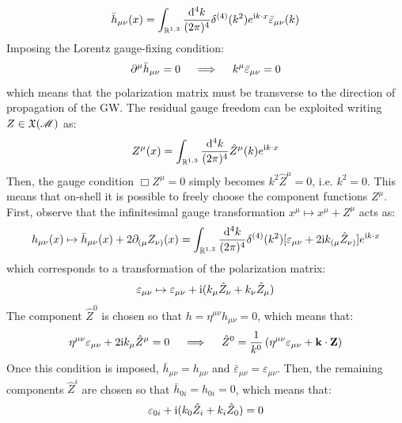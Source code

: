 \begin{equation}
  \bar{h}_{\mu \nu}(x) = \int_{\mathbb{R}^{1,3}} \frac{\mathrm{d}^4k}{(2\pi)^4} \delta^{(4)}(k^2) e^{\mathrm{i} k \cdot x} \bar{\varepsilon}_{\mu \nu}(k)
\end{equation}
Imposing the Lorentz gauge-fixing condition:
\begin{equation*}
  \partial^\mu \bar{h}_{\mu \nu} = 0
  \quad \implies \quad
  k^\mu \bar{\varepsilon}_{\mu \nu} = 0
\end{equation*}
which means that the polarization matrix must be transverse to the direction of propagation of the GW. The residual gauge freedom can be exploited writing $ Z \in \mathfrak{X}(\mathscr{M}) $ as:
\begin{equation*}
  Z^\mu(x) = \int_{\mathbb{R}^{1,3}} \frac{\mathrm{d}^4k}{(2\pi)^4} \hat{Z}^\mu(k) e^{\mathrm{i} k \cdot x}
\end{equation*}
Then, the gauge condition $ \Box Z^\mu = 0 $ simply becomes $ k^2 \hat{Z}^\mu = 0 $, i.e. $ k^2 = 0 $. This means that on-shell it is possible to freely choose the component functions $ Z^\mu $. First, observe that the infinitesimal gauge transformation $ x^\mu \mapsto x^\mu + Z^\mu $ acts as:
\begin{equation*}
  h_{\mu \nu}(x) \mapsto \bar{h}_{\mu \nu}(x) + 2 \partial_{(\mu} Z_{\nu)}(x) = \int_{\mathbb{R}^{1,3}} \frac{\mathrm{d}^4k}{(2\pi)^4} \delta^{(4)}(k^2) [ \varepsilon_{\mu \nu} + 2 \mathrm{i} k_{(\mu} \hat{Z}_{\nu)} ] e^{\mathrm{i} k \cdot x}
\end{equation*}
which corresponds to a transformation of the polarization matrix:
\begin{equation}
  \varepsilon_{\mu \nu} \mapsto \varepsilon_{\mu \nu} + \mathrm{i} ( k_\mu \hat{Z}_\nu + k_\nu \hat{Z}_\mu )
\end{equation}
The component $ \hat{Z}^0 $ is chosen so that $ h = \eta^{\mu \nu} h_{\mu \nu} = 0 $, which means that:
\begin{equation*}
  \eta^{\mu \nu} \varepsilon_{\mu \nu} + 2 \mathrm{i} k_\mu \hat{Z}^\mu = 0
  \quad \implies \quad
  \hat{Z}^0 = \frac{1}{k^0} \left( \eta^{\mu \nu} \varepsilon_{\mu \nu} + \mathbf{k} \cdot \mathbf{Z} \right)
\end{equation*}
Once this condition is imposed, $ \bar{h}_{\mu \nu} = h_{\mu \nu} $ and $ \bar{\varepsilon}_{\mu \nu} = \varepsilon_{\mu \nu} $. Then, the remaining components $ \hat{Z}^i $ are chosen so that $ \bar{h}_{0i} = h_{0i} = 0 $, which means that:
\begin{equation*}
  \varepsilon_{0i} + \mathrm{i} ( k_0 \hat{Z}_i + k_i \hat{Z}_0 ) = 0
\end{equation*}
